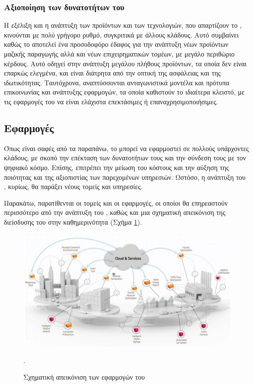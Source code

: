 \subsubsection{Αξιοποίηση των δυνατοτήτων του }
Η εξέλιξη και η ανάπτυξη των προϊόντων και των τεχνολογιών, που απαρτίζουν το , κινούνται με πολύ γρήγορο ρυθμό, συγκριτικά με άλλους κλάδους. 
Αυτό συμβαίνει καθώς το  αποτελεί ένα προσοδοφόρο έδαφος για την ανάπτυξη νέων προϊόντων μαζικής παραγωγής αλλά και νέων επιχειρηματικών τομέων, με μεγάλο περιθώριο κέρδους. 
Αυτό οδηγεί στην ανάπτυξη μεγάλου πλήθους προϊόντων, τα οποία δεν είναι επαρκώς ελεγμένα, και είναι διάτρητα από την οπτική της ασφάλειας και της ιδωτικότητας. 
Ταυτόχρονα, αναπτύσσονται ανταγωνιστικά μοντέλα και πρότυπα επικοινωνίας και ανάπτυξης εφαρμογών, τα οποία καθιστούν το  ιδιαίτερα κλειστό, με τις εφαρμογές του να είναι ελάχιστα επεκτάσιμες ή επαναχρησιμοποιήσιμες. 
\subsection{Εφαρμογές}
Όπως είναι σαφές από τα παραπάνω, το  μπορεί να εφαρμοστεί σε πολλούς υπάρχοντες κλάδους, με σκοπό την επέκταση των δυνατοτήτων τους και την σύνδεση τους με τον ψηφιακό κόσμο.
Επίσης, επιτρέπει την μείωση του κόστους και την αύξηση της ποιότητας και της αξιοπιστίας των παρεχομένων υπηρεσιών. 
Ωστόσο, η ανάπτυξη του , κυρίως, θα παράξει νέους τομείς και υπηρεσίες.
\par
Παρακάτω, παρατίθενται οι τομείς και οι εφαρμογές, οι οποίοι θα επηρεαστούν περισσότερο από την ανάπτυξη του , καθώς και μια σχηματική απεικόνιση της διείσδυσης του  στην καθημερινότητα (Σχήμα \ref{iotapp}).
\begin{figure}[h!]
\centering
\includegraphics[scale=0.6]{images/iot_applications.png}
\caption{Σχηματική απεικόνιση των εφαρμογών του  \cite{iot_applications}}.
\label{iotapp}
\end{figure}

